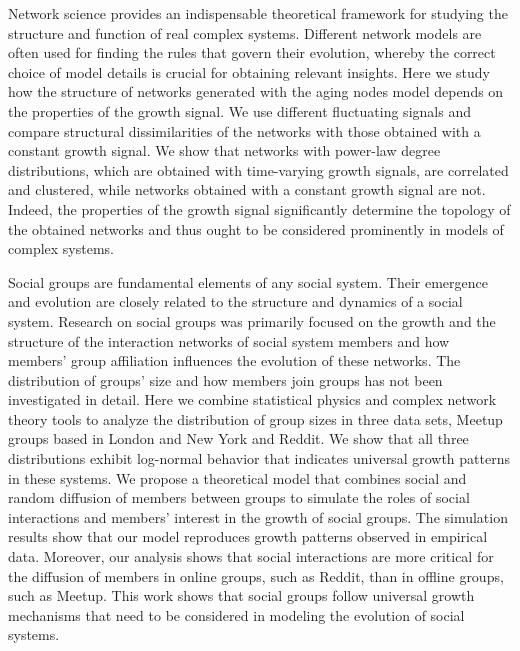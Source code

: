 
Network science provides an indispensable theoretical framework for
studying the structure and function of real complex systems. Different
network models are often used for finding the rules that govern their
evolution, whereby the correct choice of model details is crucial for
obtaining relevant insights. Here we study how the structure of
networks generated with the aging nodes model depends on the
properties of the growth signal. We use different fluctuating signals
and compare structural dissimilarities of the networks with those
obtained with a constant growth signal. We show that networks with
power-law degree distributions, which are obtained with time-varying
growth signals, are correlated and clustered, while networks obtained
with a constant growth signal are not. Indeed, the properties of the
growth signal significantly determine the topology of the obtained
networks and thus ought to be considered prominently in models of
complex systems.

Social groups are fundamental elements of any social system. Their emergence and evolution are closely related to the structure and dynamics of a social system. Research on social groups was primarily focused on the growth and the structure of the interaction networks of social system members and how members' group affiliation influences the evolution of these networks. The distribution of groups' size and how members join groups has not been investigated in detail. Here we combine statistical physics and complex network theory tools to analyze the distribution of group sizes in three data sets, Meetup groups based in London and New York and Reddit. We show that all three distributions exhibit log-normal behavior that indicates universal growth patterns in these systems. We propose a theoretical model that combines social and random diffusion of members between groups to simulate the roles of social interactions and members' interest in the growth of social groups. The simulation results show that our model reproduces growth patterns observed in empirical data. Moreover, our analysis shows that social interactions are more critical for the diffusion of members in online groups, such as Reddit, than in offline groups, such as Meetup. This work shows that social groups follow universal growth mechanisms that need to be considered in modeling the evolution of social systems. 

